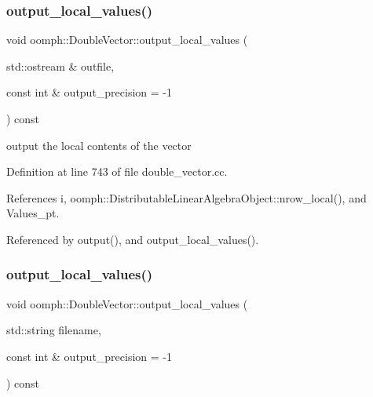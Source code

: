 \subsubsection{\texorpdfstring{output\+\_\+local\+\_\+values()}{output\_local\_values()}\hspace{0.1cm}{\footnotesize\ttfamily [1/2]}}
{\footnotesize\ttfamily void oomph\+::\+Double\+Vector\+::output\+\_\+local\+\_\+values (\begin{DoxyParamCaption}\item[{std\+::ostream \&}]{outfile,  }\item[{const int \&}]{output\+\_\+precision = {\ttfamily -\/1} }\end{DoxyParamCaption}) const}



output the local contents of the vector 



Definition at line 743 of file double\+\_\+vector.\+cc.



References i, oomph\+::\+Distributable\+Linear\+Algebra\+Object\+::nrow\+\_\+local(), and Values\+\_\+pt.



Referenced by output(), and output\+\_\+local\+\_\+values().

\mbox{\label{classoomph_1_1DoubleVector_a1cbc454999c271e7cb476f7c5c76ce72}} 
\subsubsection{\texorpdfstring{output\+\_\+local\+\_\+values()}{output\_local\_values()}\hspace{0.1cm}{\footnotesize\ttfamily [2/2]}}
{\footnotesize\ttfamily void oomph\+::\+Double\+Vector\+::output\+\_\+local\+\_\+values (\begin{DoxyParamCaption}\item[{std\+::string}]{filename,  }\item[{const int \&}]{output\+\_\+precision = {\ttfamily -\/1} }\end{DoxyParamCaption}) const\hspace{0.3cm}{\ttfamily [inline]}}



